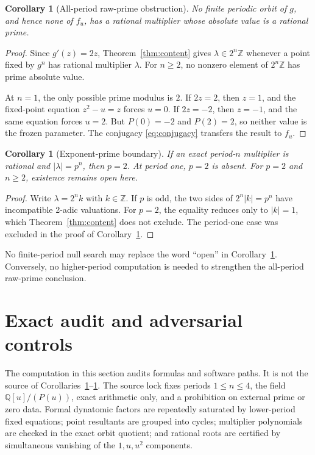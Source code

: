 \documentclass[11pt]{article}
\newtheorem{corollary}[theorem]{Corollary}
\theoremstyle{remark}
\begin{document}
\begin{corollary}[All-period raw-prime obstruction]
\label{cor:raw-prime}
No finite periodic orbit of \(g\), and hence none of \(f_u\), has a rational
multiplier whose absolute value is a rational prime.
\end{corollary}

\begin{proof}
Since \(g'(z)=2z\), Theorem~\ref{thm:content} gives
\(\lambda\in2^n\mathbb Z\) whenever a point fixed by \(g^n\) has rational
multiplier \(\lambda\).  For \(n\ge2\), no nonzero element of
\(2^n\mathbb Z\) has prime absolute value.

At \(n=1\), the only possible prime modulus is \(2\).  If \(2z=2\), then
\(z=1\), and the fixed-point equation \(z^2-u=z\) forces \(u=0\).  If
\(2z=-2\), then \(z=-1\), and the same equation forces \(u=2\).  But
\(P(0)=-2\) and \(P(2)=2\), so neither value is the frozen parameter.  The
conjugacy \eqref{eq:conjugacy} transfers the result to \(f_u\).
\end{proof}

\begin{corollary}[Exponent-prime boundary]
\label{cor:exponent-prime}
If an exact period-\(n\) multiplier is rational and
\(|\lambda|=p^n\), then \(p=2\).  At period one, \(p=2\) is absent.  For
\(p=2\) and \(n\ge2\), existence remains open here.
\end{corollary}

\begin{proof}
Write \(\lambda=2^n k\) with \(k\in\mathbb Z\).  If \(p\) is odd, the two
sides of \(2^n|k|=p^n\) have incompatible 2-adic valuations.  For \(p=2\),
the equality reduces only to \(|k|=1\), which Theorem~\ref{thm:content} does
not exclude.  The period-one case was excluded in the proof of
Corollary~\ref{cor:raw-prime}.
\end{proof}

No finite-period null search may replace the word ``open'' in
Corollary~\ref{cor:exponent-prime}.  Conversely, no higher-period computation
is needed to strengthen the all-period raw-prime conclusion.

\section{Exact audit and adversarial controls}
\label{sec:audit}

The computation in this section audits formulas and software paths.  It is
not the source of Corollaries~\ref{cor:raw-prime}--\ref{cor:exponent-prime}.
The source lock fixes periods \(1\le n\le4\), the field
\(\mathbb Q[u]/(P(u))\), exact arithmetic only, and a prohibition on external
prime or zero data.  Formal dynatomic factors are repeatedly saturated by
lower-period fixed equations; point resultants are grouped into cycles;
multiplier polynomials are checked in the exact orbit quotient; and rational
roots are certified by simultaneous vanishing of the \(1,u,u^2\) components.
\end{document}
